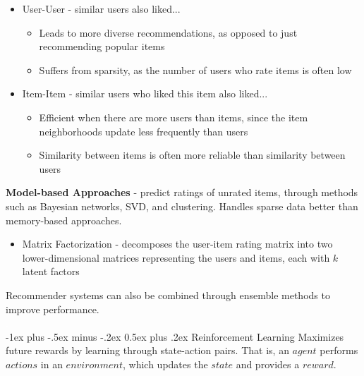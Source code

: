 \documentclass[10pt,landscape]{article}
\makeatletter
\renewcommand{\section}{\@startsection{section}{1}{0mm}%
                                {-1ex plus -.5ex minus -.2ex}%
                                {0.5ex plus .2ex}%
                                {\normalfont\large\bfseries}}
\makeatother
\begin{document}
\begin{multicols}{3}
\begin{itemize}[label={--},leftmargin=4mm]
\itemsep -.4mm
\item User-User - similar users also liked...
\begin{itemize}[label={--},leftmargin=4mm]
    \vspace{-1mm}
    \itemsep -.4mm
    \item Leads to more diverse recommendations, as opposed to just recommending popular items
    \item Suffers from sparsity, as the number of users who rate items is often low
    \end{itemize}
    \vspace{-1mm}
\item Item-Item - similar users who liked this item also liked...
    \begin{itemize}[label={--},leftmargin=4mm]
    \itemsep -.4mm
    \vspace{-1.5mm}
    \item Efficient when there are more users than items, since the item neighborhoods update less frequently than users
    \item Similarity between items is often more reliable than similarity between users
    \end{itemize}
\end{itemize}
\vspace{-1.5mm}
\smallskip
\textbf{Model-based Approaches} - predict ratings of unrated items, through methods such as Bayesian networks, SVD, and clustering. Handles sparse data better than memory-based approaches.\\
\begin{itemize}[label={--},leftmargin=4mm]
\itemsep -.4mm
\vspace{-.5mm}
\item Matrix Factorization - decomposes the user-item rating matrix into two lower-dimensional matrices representing the users and items, each with $k$ latent factors
\end{itemize}
\smallskip
\vspace{-1mm}
Recommender systems can also be combined through ensemble methods to improve performance.
\columnbreak
\\\textcolor{white}{.}\vspace{-3mm}\\ %
\section{Reinforcement Learning}
Maximizes future rewards by learning through state-action pairs. That is, an $agent$ performs $actions$ in an $environment$, which updates the $state$ and provides a $reward$.


\end{multicols}
\end{document}
